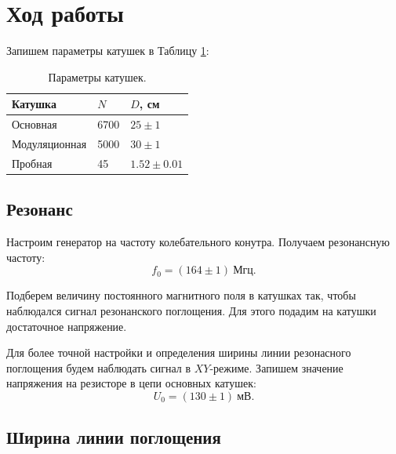 \documentclass[a4paper, 12pt]{article}
\begin{document}
	
	
	\newpage
	\section*{Ход работы}
	    Запишем параметры катушек в  Таблицу \ref{table:coils}:
	    
	    \begin{table}[h]
	    \label{table:coils}
	    \centering
            \begin{tabular}{|l|l|l|}
            \hline
            \textbf{Катушка} & $N$ & $D$, см \\ \hline \hline
            Основная         & 6700         & $25\pm1$             \\ \hline
            Модуляционная    & 5000         & $30\pm1$             \\ \hline
            Пробная          & 45           & $1.52\pm0.01$             \\ \hline
            \end{tabular}
            \caption{Параметры катушек.}
        \end{table}
        
        \subsection*{Резонанс}
	    
	    
		Настроим генератор на частоту колебательного конутра. Получаем резонансную частоту:
		\begin{equation*}
			f_0 = (164 \pm 1) \ \text{Мгц}.
		\end{equation*}
	
		Подберем величину постоянного магнитного поля в катушках так, чтобы наблюдался сигнал резонанского поглощения. Для этого подадим на катушки достаточное напряжение.
		
		Для более точной настройки и определения ширины линии резонасного поглощения будем наблюдать сигнал в $XY$-режиме. Запишем значение напряжения на резисторе в цепи основных катушек:
		\begin{equation*}
			U_0 = (130 \pm 1) \ \text{мВ}.
		\end{equation*}
		
		\subsection*{Ширина линии поглощения}
	
\end{document}

